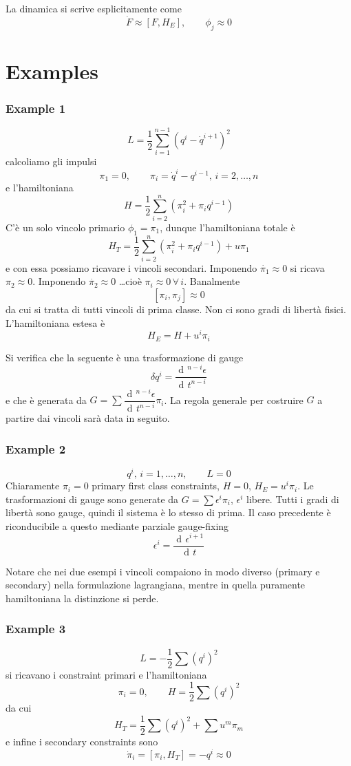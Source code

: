 \documentclass[a4paper, 11pt]{article}
\newcommand{\dd}{\mathop{\mathrm{d}\!}{}}
\newcommand{\deriv}[2]{\dfrac{\dd #1}{\dd #2}}
\begin{document}
	La dinamica si scrive esplicitamente come
	\[ \dot{F} \approx [F, H_E],\qquad \phi_j \approx 0 \]
	
	\section{Examples}
	\subsubsection{Example 1}
	\[ L = \dfrac{1}{2} \sum_{i=1}^{n-1} (q^i-\dot{q}^{i+1})^2 \]
	calcoliamo gli impulsi
	\[ \pi_1 = 0,\qquad \pi_i = \dot{q}^i-q^{i-1},\,i=2,\dots,n \]
	e l'hamiltoniana
	\[ H = \dfrac{1}{2} \sum_{i=2}^{n} \left(\pi_i^2 + \pi_i q^{i-1}\right) \]
	C'è un solo vincolo primario $\phi_1 = \pi_1$, dunque l'hamiltoniana totale è
	\[ H_T = \dfrac{1}{2} \sum_{i=2}^{n} \left(\pi_i^2 + \pi_i q^{i-1}\right) + u \pi_1 \]
	e con essa possiamo ricavare i vincoli secondari. Imponendo $\dot{\pi_1}\approx 0$ si ricava $\pi_2 \approx 0$. Imponendo $\dot{\pi_2} \approx 0$ \dots cioè $\pi_i \approx 0\,\forall\,i$. Banalmente
	\[ [\pi_i, \pi_j] \approx 0 \]
	da cui si tratta di tutti vincoli di prima classe. Non ci sono gradi di libertà fisici.
	L'hamiltoniana estesa è
	\[ H_E = H + u^i \pi_i \]
	
	Si verifica che la seguente è una trasformazione di gauge
	\[ \delta q^i = \deriv{^{n-i} \epsilon}{t^{n-i}} \]
	e che è generata da $G = \sum \deriv{^{n-i} \epsilon}{t^{n-i}} \pi_i$. La regola generale per costruire $G$ a partire dai vincoli sarà data in seguito.
	
	\subsubsection{Example 2}
	\[ q^i,\,i=1,\dots,n,\qquad L=0 \]
	Chiaramente $\pi_i = 0$ primary first class constraints, $H=0$, $H_E = u^i \pi_i$. Le trasformazioni di gauge sono generate da $G = \sum \epsilon^i \pi_i$, $\epsilon^i$ libere. Tutti i gradi di libertà sono gauge, quindi il sistema è lo stesso di prima. Il caso precedente è riconducibile a questo mediante parziale gauge-fixing
	\[ \epsilon^i = \deriv{\epsilon^{i+1}}{t} \]
	
	Notare che nei due esempi i vincoli compaiono in modo diverso (primary e secondary) nella formulazione lagrangiana, mentre in quella puramente hamiltoniana la distinzione si perde.
	
	\subsubsection{Example 3}
	\[ L = -\dfrac{1}{2} \sum (q^i)^2 \]
	si ricavano i constraint primari e l'hamiltoniana
	\[ \pi_i = 0,\qquad H = \dfrac{1}{2} \sum (q^i)^2 \]
	da cui
	\[ H_T = \dfrac{1}{2} \sum (q^i)^2 + \sum u^m \pi_m \]
	e infine i secondary constraints sono
	\[ \dot{\pi}_i = [\pi_i, H_T] = -q^i \approx 0 \]
	
\end{document}
